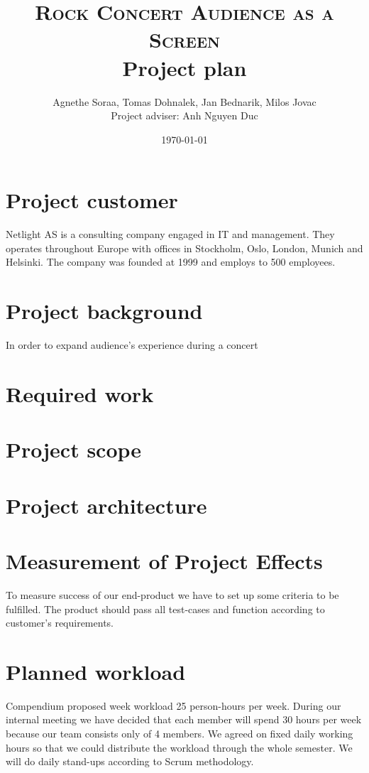 \documentclass{article}
\title{
    \normalsize \textsc{Rock Concert Audience as a Screen}\\
    \Huge Project plan}
\author{Agnethe Soraa,
Tomas Dohnalek,
Jan Bednarik,
Milos Jovac \\
\normalsize Project adviser: Anh Nguyen Duc}
\date{\today}
\begin{document}
\maketitle
\section{Project customer}
Netlight AS is a consulting company engaged in IT and management. They operates throughout Europe with offices in Stockholm, Oslo, London, Munich and Helsinki. The company was founded at 1999 and employs to 500 employees.

\section{Project background}
In order to expand audience's experience during a concert

\section{Required work}

\section{Project scope}


\section{Project architecture}


\section{Measurement of Project Effects}
To measure success of our end-product we have to set up some criteria to be fulfilled. The product should pass all test-cases and function according to customer's requirements.

\section{Planned workload}
Compendium proposed week workload 25 person-hours per week. During our internal meeting we have decided that each member will spend 30 hours per week because our team consists only of 4 members. We agreed on fixed daily working hours so that we could distribute the workload through the whole semester. We will do daily stand-ups according to Scrum methodology.
\end{document}
